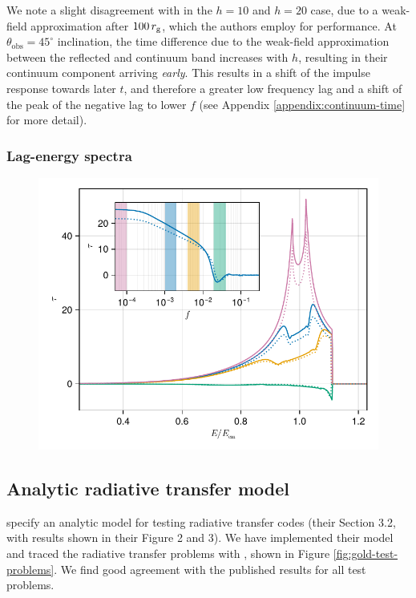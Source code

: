 \documentclass[fleqn,usenatbib]{mnras}
\begin{document}
We note a slight disagreement with \cite{cackett_modelling_2014} in the $h = 10$ and $h=20$ case, due to a weak-field approximation after $100\, r_\text{g}$, which the authors employ for performance. At $\theta_\text{obs} = 45^\circ$ inclination, the time difference due to the weak-field approximation between the reflected and continuum band increases with $h$, resulting in their continuum component arriving \textit{early}. This results in a shift of the impulse response towards later $t$, and therefore a greater low frequency lag and a shift of the peak of the negative lag to lower $f$ (see Appendix \ref{appendix:continuum-time} for more detail).

\subsubsection{Lag-energy spectra}

\begin{figure}
	\centering
	\includegraphics[width=0.98\linewidth]{figures/reverberation.lag-energy.pdf}
	\caption{}
	\label{fig:lag-energy}
\end{figure}


\subsection{Analytic radiative transfer model}

\cite{gold_verification_2020} specify an analytic model for testing radiative transfer codes (their Section 3.2, with results shown in their Figure 2 and 3). We have implemented their model and traced the radiative transfer problems with \Gradus, shown in Figure \ref{fig:gold-test-problems}. We find good agreement with the published results for all test problems.
\end{document}
